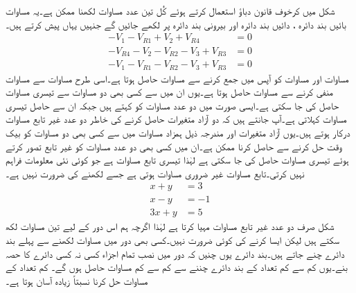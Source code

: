 شکل  میں کرخوف قانون دباؤ استعمال کرتے ہوئے کُل تین عدد مساوات لکھنا ممکن ہے۔یہ مساوات بائیں بند دائرہ ، دائیں بند دائرہ  اور بیرونی بند دائرہ  پر لکھے جائیں گے جنہیں یہاں پیش کرتے ہیں۔
\begin{align}
-V_1-V_{R1}+V_2+V_{R4}&=0  \label{مساوات_مزاحمتی_تابع_الف}\\
-V_{R4}-V_2-V_{R2}-V_3+V_{R3}&=0  \label{مساوات_مزاحمتی_تابع_ب}\\
-V_1-V_{R1}-V_{R2}-V_3+V_{R3}&=0  \label{مساوات_مزاحمتی_تابع_پ}
\end{align}
مساوات  اور مساوات  کو آپس میں جمع کرنے سے مساوات  حاصل ہوتا ہے۔اسی طرح مساوات  سے مساوات  منفی کرنے سے مساوات  حاصل ہوتا ہے۔یوں ان میں سے کسی بھی دو مساوات سے تیسری مساوات حاصل کی جا سکتی ہے۔ایسی صورت میں دو عدد مساوات کو  کہتے ہیں جبکہ ان سے حاصل تیسری مساوات  کہلاتی ہے۔آپ جانتے ہیں کہ دو آزاد متغیرات حاصل کرنے کی خاطر دو عدد غیر تابع مساوات درکار ہوتے ہیں۔یوں آزاد متغیرات  اور  مندرجہ ذیل ہمزاد مساوات  میں سے کسی بھی دو مساوات کو بیک وقت حل کرنے سے حاصل کرنا ممکن ہے۔ان میں کسی بھی دو عدد مساوات کو غیر تابع تصور کرتے ہوئے تیسری مساوات حاصل کی جا سکتی ہے لہٰذا تیسری تابع مساوات ہے جو کوئی نئی معلومات فراہم نہیں کرتی۔تابع مساوات غیر ضروری مساوات ہوتی ہے جسے لکھنے کی ضرورت نہیں ہے۔
\begin{align*}
x+y&=3\\
x-y&=-1\\
3x+y&=5
\end{align*}
شکل  صرف دو عدد غیر تابع مساوات مہیا کرتا ہے لہٰذا اگرچہ ہم اس دور کے لیے تین مساوات لکھ سکتے ہیں لیکن ایسا کرنے کی کوئی ضرورت نہیں۔کسی بھی دور میں مساوات لکھنے سے پہلے بند دائرے چنے جاتے ہیں۔بند دائرے یوں چنیں کہ دور میں نصب تمام اجزاء کسی نہ کسی دائرے کا حصہ بنے۔یوں کم سے کم تعداد کے بند دائرے چننے سے کم سے کم مساوات حاصل ہوں گے۔ کم تعداد کے مساوات حل کرنا نسبتاً زیادہ آسان ہوتا ہے۔

